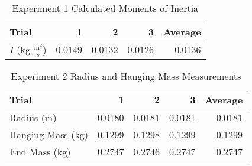 \documentclass [12pt, letterpaper, twoside] {article}
\begin{document}
\begin {table}[h]
  \centering
  \begin {tabular} {| l | r | r | r | r |}
    \hline\hline
    Trial & 1 & 2 & 3 & Average \\
    \hline
    \(I\) (kg \(\tfrac{\text{m}^2}{s}\)) & 0.0149 & 0.0132 & 0.0126 & 0.0136 \\ %
    \hline\hline
  \end {tabular}
  \caption {Experiment 1 Calculated Moments of Inertia}
\end {table}
 
\begin {table}[h]
  \centering
  \begin {tabular} {| l | r | r | r | r |}
    \hline\hline
    Trial & 1 & 2 & 3 & Average \\
    \hline
    Radius (m) & 0.0180 & 0.0181 & 0.0181 & 0.0181 \\ %
    \hline
    Hanging Mass (kg) & 0.1299 & 0.1298 & 0.1299 & 0.1299 \\ %
    \hline
    End Mass (kg) & 0.2747 & 0.2746 & 0.2747 & 0.2747 \\ %
    \hline\hline
  \end {tabular}
  \caption {Experiment 2 Radius and Hanging Mass Measurements}
\end {table}
\end{document}
